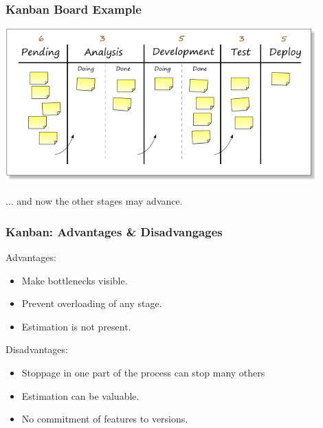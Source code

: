 \begin{frame}
\frametitle{Kanban Board Example}
\begin{center}
\includegraphics[width=0.9\textwidth]{images/kanban-board-3.png}
\end{center}
... and now the other stages may advance.
\end{frame}

\begin{frame}
\frametitle{Kanban: Advantages \& Disadvangages}
\begin{changemargin}{1cm}

Advantages:
\begin{itemize}
	\item Make bottlenecks visible.
	\item Prevent overloading of any stage.
	\item Estimation is not present. 
\end{itemize}

Disadvantages:
\begin{itemize}
	\item Stoppage in one part of the process can stop many others 
	\item Estimation can be valuable.
	\item No commitment of features to versions.
\end{itemize}

\end{changemargin}
\end{frame}




